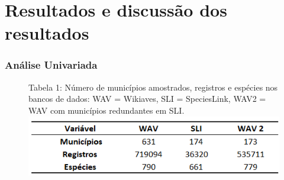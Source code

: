 \section{Resultados e discussão dos resultados}

\subsubsection{Análise Univariada}

\begin{figure}[h!]
\centering
{\scriptsize Tabela 1: Número de municípios amostrados, registros e espécies nos bancos de dados: WAV = Wikiaves, SLI = SpeciesLink, WAV2 = WAV com municípios redundantes em SLI.}
\includegraphics{Tabelas/1.png}
\end{figure}

\newpage

